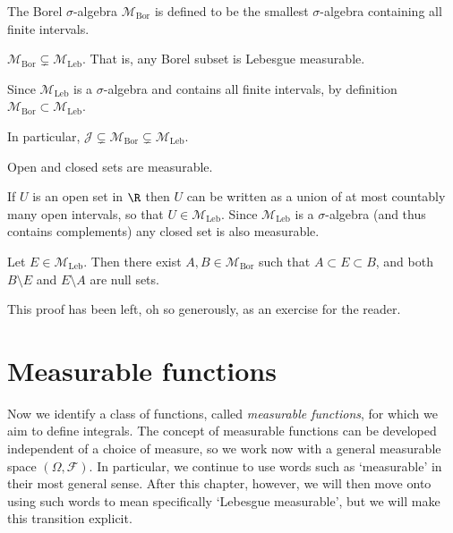 \documentclass{maths}
\newcommand{\mleb}{\mathcal{M}_{\text{Leb}}}
\newcommand{\mbor}{\mathcal{M}_{\text{Bor}}}
\newcommand{\alg}{\mathcal{F}}
\newcommand{\intvl}{\mathcal{J}}
\begin{document}
\begin{defn}
    The Borel $\sigma$-algebra $\mbor$ is defined to be the smallest $\sigma$-algebra containing all finite intervals.
\end{defn}

\begin{prop}
    $\mbor\subsetneq\mleb$.
    That is, any Borel subset is Lebesgue measurable.
\end{prop}

\begin{prf}
    Since $\mleb$ is a $\sigma$-algebra and contains all finite intervals, by definition $\mbor\subset\mleb$.
\end{prf}

\begin{rem}
    In particular, $\intvl\subsetneq\mbor\subsetneq\mleb$.
\end{rem}

\begin{cor}
    Open and closed sets are measurable.
\end{cor}

\begin{prf}
    If $U$ is an open set in $\R$ then $U$ can be written as a union of at most countably many open intervals, so that $U\in\mleb$.
    Since $\mleb$ is a $\sigma$-algebra (and thus contains complements) any closed set is also measurable.
\end{prf}

\begin{prop}
    Let $E\in\mleb$.
    Then there exist $A,B\in\mbor$ such that $A\subset E\subset B$, and both $B\setminus E$ and $E\setminus A$ are null sets.
\end{prop}

\begin{prf}
    This proof has been left, oh so generously, as an exercise for the reader.
\end{prf}

\section{Measurable functions}

Now we identify a class of functions, called \emph{measurable functions}, for which we aim to define integrals.
The concept of measurable functions can be developed independent of a choice of measure, so we work now with a general measurable space $(\Omega,\alg)$.
In particular, we continue to use words such as `measurable' in their most general sense.
After this chapter, however, we will then move onto using such words to mean specifically `Lebesgue measurable', but we will make this transition explicit.
\end{document}
